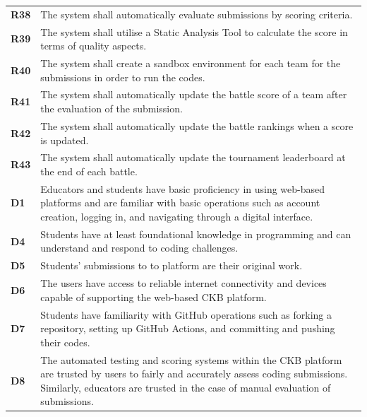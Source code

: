\begin{table}[h!]
\begin{tabular}{lp{15cm}}
\textbf{R38} & The system shall automatically evaluate submissions by scoring criteria.\\
\textbf{R39} & The system shall utilise a Static Analysis Tool to calculate the score in terms of quality aspects.\\

\textbf{R40} & The system shall create a sandbox environment for each team for the submissions in order to run the codes.\\
\textbf{R41} & The system shall automatically update the battle score of a team after the evaluation of the submission.\\
\textbf{R42} & The system shall automatically update the battle rankings when a score is updated. \\
\textbf{R43} & The system shall automatically update the tournament leaderboard at the end of each battle.\\


    \hline
    \hline
    \textbf{D1} & Educators and students have basic proficiency in using web-based platforms and are familiar with basic operations such as account creation, logging in, and navigating through a digital interface.\\
    \textbf{D4} & Students have at least foundational knowledge in programming and can understand and respond to coding challenges. \\
    \textbf{D5} & Students’ submissions to to platform are their original work. \\
    \textbf{D6} & The users have access to reliable internet connectivity and devices capable of supporting the web-based CKB platform. \\
    \textbf{D7} & Students have familiarity with GitHub operations such as forking a repository, setting up GitHub Actions, and committing and pushing their codes.\\
    \textbf{D8} & The automated testing and scoring systems within the CKB platform are trusted by users to fairly and accurately assess coding submissions. Similarly, educators are trusted in the case of manual evaluation of submissions.\\
    
    \hline
  \end{tabular}
\end{table}



\newpage




